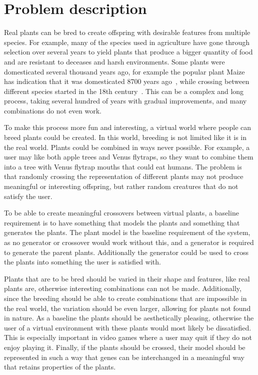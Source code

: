 \section{Problem description}
Real plants can be bred to create offspring with desirable features from multiple species.
For example, many of the species used in agriculture have gone through selection over several years to yield plants that produce a bigger quantity of food and are resistant to deceases and harsh environments.
Some plants were domesticated several thousand years ago, for example the popular plant Maize has indication that it was domesticated 8700 years ago~\cite{2009Starch}, while crossing between different species started in the 18th century~\cite{PlantBreeding}.
This can be a complex and long process, taking several hundred of years with gradual improvements, and many combinations do not even work.~\cite{2014Hartung, PlantBreeding}

To make this process more fun and interesting, a virtual world where people can breed plants could be created.
In this world, breeding is not limited like it is in the real world.
Plants could be combined in ways never possible.
For example, a user may like both apple trees and Venus flytraps, so they want to combine them into a tree with Venus flytrap mouths that could eat humans.
The problem is that randomly crossing the representation of different plants may not produce meaningful or interesting offspring, but rather random creatures that do not satisfy the user.

To be able to create meaningful crossovers between virtual plants, a baseline requirement is to have something that models the plants and something that generates the plants.
The plant model is the baseline requirement of the system, as no generator or crossover would work without this, and a generator is required to generate the parent plants.
Additionally the generator could be used to cross the plants into something the user is satisfied with.

Plants that are to be bred should be varied in their shape and features, like real plants are, otherwise interesting combinations can not be made.
Additionally, since the breeding should be able to create combinations that are impossible in the real world, the variation should be even larger, allowing for plants not found in nature.
As a baseline the plants should be aesthetically pleasing, otherwise the user of a virtual environment with these plants would most likely be dissatisfied.
This is especially important in video games where a user may quit if they do not enjoy playing it.
Finally, if the plants should be crossed, their model should be represented in such a way that genes can be interchanged in a meaningful way that retains properties of the plants.

